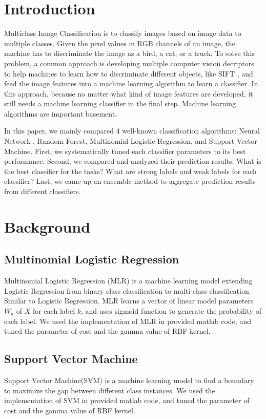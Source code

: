 \documentclass{acm_proc_article-sp}
\begin{document}
\section{Introduction}
Multiclass Image Classification is to classify images based on image data to multiple classes. Given the pixel values in RGB channels of an image, the machine has to discriminate the image as  a bird, a cat, or a truck. To solve this problem, a common approach is developing multiple computer vision decriptors to help machines to learn how to discriminate different objects, like SIFT \cite{Lowe:2004uq}, and feed the image features into a machine learning algorithm to learn a classifier. 
In this approach, because no matter what kind of image features are developed, it still needs a machine learning classifier in the final step. Machine learning algorithms are important basement. 

In this paper, we mainly compared 4 well-known classification algorithms: Neural Network \cite{HechtNielsen:1989et}, Random Forest\cite{Breiman:2001fb}, Multinomial Logistic Regression\cite{Hosmer:2000vg}, and Support Vector Machine\cite{Vapnik:2000te}. First, we systematically tuned each classifier parameters to its best performance. Second, we compared and analyzed their prediction results: What is the best classifier for the tasks? What are strong labels and weak labels for each classifier?  Last, we came up an ensemble method to aggregate prediction results from different classifiers. 


\section{Background}
\subsection{Multinomial Logistic Regression}
Multinomial Logistic Regression (MLR)\cite{Hosmer:2000vg} is a machine learning model extending Logistic Regression from binary class classification to multi-class classification. Similar to Logistic Regression, MLR learns a vector of linear model parameters $W_k$ of $X$ for each label $k$, and uses sigmoid function to generate the probability of each label. We used the implementation of MLR in provided matlab code, and tuned the parameter of cost and the gamma value of RBF kernel.

\subsection{Support Vector Machine}
Support Vector Machine(SVM)\cite{Vapnik:2000te} is a machine learning model to find a boundary to maximize the gap between different class instances. We used the implementation of SVM in provided matlab code, and tuned the parameter of cost and the gamma value of RBF kernel.
\end{document}
